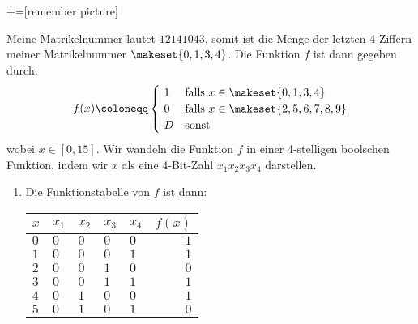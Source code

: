 \newcommand{\boxy}[2][yellow]{\mathchoice%
  {\pgfsetfillopacity{0.3}\colorbox{#1}{\pgfsetfillopacity{1}$\displaystyle#2$}}%
  {\pgfsetfillopacity{0.3}\colorbox{#1}{\pgfsetfillopacity{1}$\textstyle#2$}}%
  {\pgfsetfillopacity{0.3}\colorbox{#1}{\pgfsetfillopacity{1}$\scriptstyle#2$}}%
  {\pgfsetfillopacity{0.3}\colorbox{#1}{\pgfsetfillopacity{1}$\scriptscriptstyle#2$}}}%

\let\not\xoverline
\let\nor\downarrow
\newcommand{\xor}[2]{\not{#1}#2 \lor #1\not{#2}}
+=[remember picture]

\begin{enumerate}[label={[OH\arabic*]},start=1]
    \item Meine Matrikelnummer lautet $12141043$, somit ist die Menge der letzten 4 Ziffern meiner Matrikelnummer $\makeset{0, 1, 3, 4}$. Die Funktion $f$ ist dann gegeben durch:
        \begin{equation*}
            f(x) \coloneqq 
            \begin{cases}
                ~1 & \text{falls } x \in \makeset{0, 1, 3, 4} \\
                ~0 & \text{falls } x \in \makeset{2, 5, 6, 7, 8, 9} \\
                ~D & \text{sonst}
            \end{cases}
        \end{equation*}
        wobei $x \in [0, 15]$. Wir wandeln die Funktion $f$ in einer 4-stelligen boolschen Funktion, indem wir $x$ als eine 4-Bit-Zahl $x_1x_2x_3x_4$ darstellen.
        \begin{enumerate}
            \item Die Funktionstabelle von $f$ ist dann:
                \begin{center}
                    \begin{tabular}{lllllr}
                        \toprule
                        $x$ & $x_1$ & $x_2$ & $x_3$ & $x_4$ & $f(x)$ \\
                        \midrule
                        $0$ & $0$ & $0$ & $0$ & $0$ & $1$ \\
                        $1$ & $0$ & $0$ & $0$ & $1$ & $1$ \\
                        $2$ & $0$ & $0$ & $1$ & $0$ & $0$ \\
                        $3$ & $0$ & $0$ & $1$ & $1$ & $1$ \\
                        $4$ & $0$ & $1$ & $0$ & $0$ & $1$ \\
                        $5$ & $0$ & $1$ & $0$ & $1$ & $0$ \\

\end{tabular}
\end{center}
\end{enumerate}
\end{enumerate}
